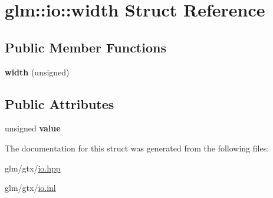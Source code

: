 \hypertarget{structglm_1_1io_1_1width}{\section{glm\-:\-:io\-:\-:width Struct Reference}
\label{structglm_1_1io_1_1width}
}
\subsection*{Public Member Functions}
\begin{DoxyCompactItemize}
\item 
\hypertarget{structglm_1_1io_1_1width_a1576674b7e08dc5014ce4f41ac6eea5b}{{\bfseries width} (unsigned)}\label{structglm_1_1io_1_1width_a1576674b7e08dc5014ce4f41ac6eea5b}

\end{DoxyCompactItemize}
\subsection*{Public Attributes}
\begin{DoxyCompactItemize}
\item 
\hypertarget{structglm_1_1io_1_1width_a6bf1338eb947811d36ec93bd2e9b8425}{unsigned {\bfseries value}}\label{structglm_1_1io_1_1width_a6bf1338eb947811d36ec93bd2e9b8425}

\end{DoxyCompactItemize}


The documentation for this struct was generated from the following files\-:\begin{DoxyCompactItemize}
\item 
glm/gtx/\hyperlink{io_8hpp}{io.\-hpp}\item 
glm/gtx/\hyperlink{io_8inl}{io.\-inl}\end{DoxyCompactItemize}
